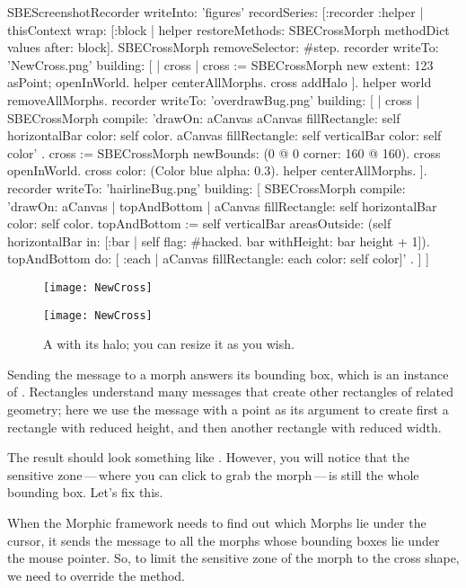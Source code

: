\documentclass[a4paper,10pt,twoside]{book}
\begin{document}
\begin{ExecuteSmalltalkScript}
SBEScreenshotRecorder writeInto: 'figures' recordSeries: [:recorder :helper |
	thisContext wrap: [:block | helper restoreMethods: SBECrossMorph methodDict values after: block].
	SBECrossMorph removeSelector: #step.
	recorder writeTo: 'NewCross.png' building: [
		| cross |
		cross := SBECrossMorph new
			extent: 123 asPoint;
			openInWorld.
		helper centerAllMorphs.
		cross addHalo
	].
	helper world removeAllMorphs.
	recorder writeTo: 'overdrawBug.png' building: [
		| cross |
		SBECrossMorph compile: 'drawOn: aCanvas
	aCanvas fillRectangle: self horizontalBar color: self color.
	aCanvas fillRectangle: self verticalBar color: self color'
		.
		cross := SBECrossMorph newBounds: (0 @ 0 corner: 160 @ 160).
		cross openInWorld.
		cross color: (Color blue alpha: 0.3).
		helper centerAllMorphs.
	].
	recorder writeTo: 'hairlineBug.png' building: [
		SBECrossMorph
			compile: 'drawOn: aCanvas
	| topAndBottom |
	aCanvas fillRectangle: self horizontalBar color: self color.
	topAndBottom := self verticalBar areasOutside: (self horizontalBar in: [:bar |
		self flag: #hacked.
		bar withHeight: bar height + 1]).
	topAndBottom do: [ :each | aCanvas fillRectangle: each color: self color]'
			.
	]
]
\end{ExecuteSmalltalkScript}
\begin{figure}[hbt]
	\ifluluelse
		{\centerline{\texttt{[image: NewCross]}}}
		{\centerline{\texttt{[image: NewCross]}}}
	\caption{A  with its halo; you can resize it as you wish.
		\label{fig:cross}}
\end{figure}


Sending the  message to a morph answers its bounding box, which is an instance of .
Rectangles understand many messages that create other rectangles of related geometry; here we use the  message with a point as its argument to create first a rectangle with reduced height, and then another rectangle with reduced width.

The result should look something like .
However, you will notice that the sensitive zone\,---\,where you can click to grab the morph\,---\,is still the whole bounding box.  Let's fix this.

When the Morphic framework needs to find out which Morphs lie under the cursor, it sends the message  to all the morphs whose bounding boxes lie under the mouse pointer.
So, to limit the sensitive zone of the morph to the cross shape, we need to override the  method.
\end{document}
